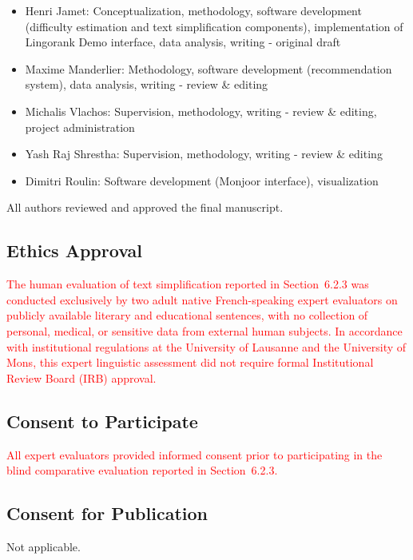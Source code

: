 \begin{itemize}
    \item Henri Jamet: Conceptualization, methodology, software development (difficulty estimation and text simplification components), implementation of Lingorank Demo interface, data analysis, writing - original draft
    \item Maxime Manderlier: Methodology, software development (recommendation system), data analysis, writing - review \& editing
    \item Michalis Vlachos: Supervision, methodology, writing - review \& editing, project administration
    \item Yash Raj Shrestha: Supervision, methodology, writing - review \& editing
    \item Dimitri Roulin: Software development (Monjoor interface), visualization
\end{itemize}

All authors reviewed and approved the final manuscript.

\subsection*{Ethics Approval}
\textcolor{red}{The human evaluation of text simplification reported in Section~6.2.3 was conducted exclusively by two adult native French-speaking expert evaluators on publicly available literary and educational sentences, with no collection of personal, medical, or sensitive data from external human subjects. In accordance with institutional regulations at the University of Lausanne and the University of Mons, this expert linguistic assessment did not require formal Institutional Review Board (IRB) approval.}

\subsection*{Consent to Participate}
\textcolor{red}{All expert evaluators provided informed consent prior to participating in the blind comparative evaluation reported in Section~6.2.3.}

\subsection*{Consent for Publication}
Not applicable.
